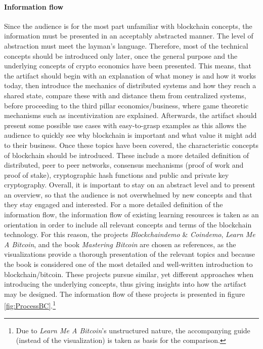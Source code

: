 \paragraph{Information flow} Since the audience is for the most part unfamiliar with blockchain concepts, the information must be presented in an acceptably abstracted manner. The level of abstraction must meet the layman's language. Therefore, most of the technical concepts should be introduced only later, once the general purpose and the underlying concepts of crypto economics have been presented. This means, that the artifact should begin with an explanation of what money is and how it works today, then introduce the mechanics of distributed systems and how they reach a shared state, compare these with and distance them from centralized systems, before proceeding to the third pillar economics/business, where game theoretic mechanisms such as incentivization are explained. Afterwards, the artifact should present some possible use cases with easy-to-grasp examples as this allows the audience to quickly see why blockchain is important and what value it might add to their business. Once these topics have been covered, the characteristic concepts of blockchain should be introduced. These include a more detailed definition of distributed, peer to peer networks, consensus mechanisms (proof of work and proof of stake), cryptographic hash functions and public and private key cryptography. Overall, it is important to stay on an abstract level and to present an overview, so that the audience is not overwhelmed by new concepts and that they stay engaged and interested. For a more detailed definition of the information flow, the information flow of existing learning resources is taken as an orientation in order to include all relevant concepts and terms of the blockchain technology. For this reason, the projects \textit{Blockchaindemo} \& \textit{Coindemo}, \textit{Learn Me A Bitcoin}, and the book \textit{Mastering Bitcoin} are chosen as references, as the visualizations provide a thorough presentation of the relevant topics and because the book is considered one of the most detailed and well-written introduction to blockchain/bitcoin. These projects pursue similar, yet different approaches when introducing the underlying concepts, thus giving insights into how the artifact may be designed. The information flow of these projects is presented in figure \ref{fig:ProcessBC}.\footnote{Due to \textit{Learn Me A Bitcoin}'s unstructured nature, the accompanying guide (instead of the visualization) is taken as basis for the comparison.} 

